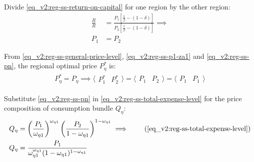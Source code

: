 \documentclass[../thesis.tex]{subfiles}
\begin{document}
Divide \ref{eq_v2:reg-ss-return-on-capital} for one region by the other region:
\begin{align}
	\frac{R}{R} &= \frac{P_{1} \left[ \frac{1}{\beta} - (1- \delta) \right]}{P_{2} \left[ \frac{1}{\beta} - (1- \delta) \right]} \implies \nonumber \\
	P_{1} &= P_{2} \label{eq_v2:reg-ss-pn}
\end{align}



From \ref{eq_v2:reg-ss-general-price-level}, \ref{eq_v2:reg-ss-p1-za1} and \ref{eq_v2:reg-ss-pn}, the regional optimal price $P_{\eta}^{\ast}$ is:
\begin{align}
	P_{\eta}^{\ast} = P_{\eta} \implies \langle \begin{matrix} P_{1}^{\ast} & P_{2}^{\ast} \end{matrix} \rangle = \langle \begin{matrix} P_{1} & P_{2} \end{matrix} \rangle = \langle \begin{matrix} P_{1} & P_{1} \end{matrix} \rangle \label{eq_v2:reg-ss-p1-p2}
\end{align}

\begin{comment}

Substitute \ref{eq_v2:reg-ss-p1-p2} and \ref{eq_v2:reg-ss-market-clearing-condition-Yt} in \ref{eq_v2:reg-ss-national-price-level} for the national price level:
\begin{align}
	P_{} &= \frac{P_{1} Y_{1} + P_{2} Y_{2}}{Y_{}} \tag{\ref{eq_v2:reg-ss-national-price-level}} \implies \nonumber \\
	P_{} &= \frac{P_{1} Y_{1} + \theta_{P} P_{1} Y_{2}}{Y_{}} \label{eq_v2:reg-ss-p1-p2-p}
\end{align}
	
\end{comment}



Substitute \ref{eq_v2:reg-ss-pn} in \ref{eq_v2:reg-ss-total-expense-level} for the price composition of consumption bundle $Q_{\eta}$:
\begin{align}
	Q_{\eta} &= \left( \frac{P_{1}}{\omega_{\eta 1}} \right)^{\omega_{\eta 1}} \left( \frac{P_{2}}{1 -\omega_{\eta 1}} \right)^{1 -\omega_{\eta 1}} \implies \tag{\ref{eq_v2:reg-ss-total-expense-level}} \\
	Q_{\eta} &= \frac{ P_{1} }{\omega_{\eta 1}^{\omega_{\eta 1}} (1 - \omega_{\eta 1})^{1 - \omega_{\eta 1}}} \label{eq_v2:reg-ss-q1}
\end{align}
\end{document}
